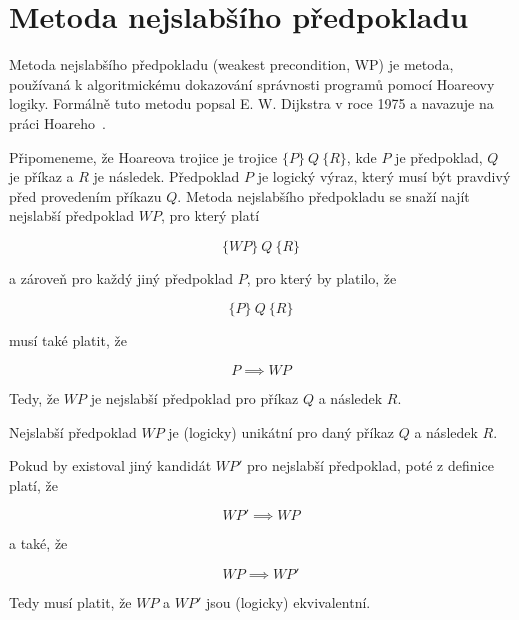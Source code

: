 \chapter{Metoda nejslabšího předpokladu}
\label{ch:metoda-nejslabsiho-predpokladu}

Metoda nejslabšího předpokladu (weakest precondition, WP) je metoda,
používaná k algoritmickému dokazování správnosti programů pomocí Hoareovy logiky.
Formálně tuto metodu popsal E. W. Dijkstra v roce 1975 a navazuje na práci Hoareho~\cite{Dijkstra1975}.

Připomeneme, že Hoareova trojice je trojice $ \{ P \} \ Q \ \{ R \} $,
kde $P$ je předpoklad, $Q$ je příkaz a $R$ je následek.
Předpoklad $P$ je logický výraz, který musí být pravdivý před provedením příkazu $Q$.
Metoda nejslabšího předpokladu se snaží najít nejslabší předpoklad $WP$, pro který platí

\begin{equation*}
    \{ WP \} \ Q \ \{ R \}
\end{equation*}

a zároveň pro každý jiný předpoklad $P$, pro který by platilo, že

\begin{equation*}
    \{ P \} \ Q \ \{ R \}
\end{equation*}

musí také platit, že

\begin{equation*}
    P \implies WP
\end{equation*}

Tedy, že $WP$ je nejslabší předpoklad pro příkaz $Q$ a následek $R$.

\begin{remark}
    Nejslabší předpoklad $WP$ je (logicky) unikátní pro daný příkaz $Q$ a následek $R$.
\end{remark}

Pokud by existoval jiný kandidát $WP'$ pro nejslabší předpoklad,
poté z definice platí, že

\begin{equation*}
    WP' \implies WP
\end{equation*}

a také, že

\begin{equation*}
    WP \implies WP'
\end{equation*}

Tedy musí platit, že $WP$ a $WP'$ jsou (logicky) ekvivalentní.

